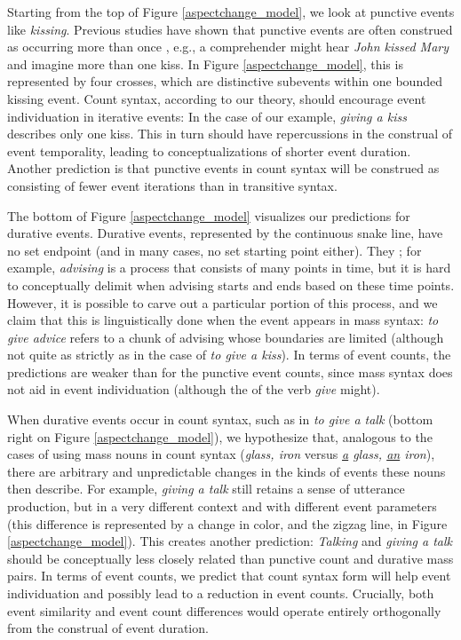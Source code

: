 \documentclass[review,12pt,authoryear]{elsarticle}
\begin{document}
Starting from the top of Figure \ref{aspectchange_model}, we look at punctive events like \emph{kissing}. Previous studies have shown that punctive events are often construed as occurring more than once \citep{paczynski2014events,barner2008events,Kim2015}, e.g., a comprehender might hear \emph{John kissed Mary} and imagine more than one kiss. In Figure \ref{aspectchange_model}, this is represented by four crosses, which are distinctive subevents within one bounded kissing event. Count syntax, according to our theory, should encourage event individuation in iterative events: In the case of our example, \emph{giving a kiss} describes only one  kiss. This in turn should have repercussions in the construal of event temporality, leading to conceptualizations of shorter event duration. Another prediction is that punctive events in count syntax will be construed as consisting of fewer event iterations than in transitive syntax. 

The bottom of Figure \ref{aspectchange_model} visualizes our predictions for durative events. Durative events, represented by the continuous snake line, have no set endpoint (and in many cases, no set starting point either). They ; for example, \emph{advising} is a process that consists of many points in time, but it is hard to conceptually delimit when advising starts and ends based on these time points. However, it is possible to carve out a particular portion of this process, and we claim that this is linguistically done when the event appears in mass syntax: \emph{to give advice} refers to a chunk of advising whose boundaries are limited (although not quite as strictly as in the case of \emph{to give a kiss}). In terms of event counts, the predictions are weaker than for the punctive event counts, since mass syntax does not aid in event individuation (although the  of the verb \emph{give} might).

When durative events occur in count syntax, such as in \emph{to give a talk} (bottom right on Figure \ref{aspectchange_model}), we hypothesize that, analogous to the cases of using mass nouns in count syntax (\emph{glass, iron} versus \emph{\underline{a} glass, \underline{an} iron}), there are arbitrary and unpredictable changes in the kinds of events these nouns then describe. For example, \emph{giving a talk} still retains a sense of utterance production, but in a very different context and with different event parameters (this difference is represented by a change in color, and the zigzag line, in Figure \ref{aspectchange_model}). This creates another prediction: \emph{Talking} and \emph{giving a talk} should be conceptually less closely related than punctive count and durative mass pairs. In terms of event counts, we predict that count syntax form will help event individuation and possibly lead to a reduction in event counts. Crucially, both event similarity and event count differences would operate entirely orthogonally from the construal of event duration.
\end{document}
